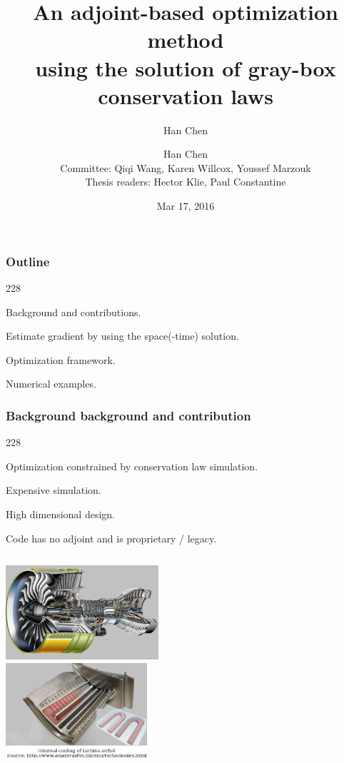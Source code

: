 \documentclass{beamer}
\title{An adjoint-based optimization method\\ using the solution of gray-box conservation laws}
\author{\scriptsize
   Han Chen\\\vspace{0.5cm}}
\author{\scriptsize
   Han Chen\\\vspace{0.5cm} Committee: Qiqi Wang, Karen Willcox, Youssef Marzouk\\
   Thesis readers: Hector Klie, Paul Constantine}
\date{\scriptsize Mar 17, 2016}
\newcommand{\barrow}{\item[\color{darkred}\ding{228}]}
\begin{document}
\begin{frame}
    \titlepage
\end{frame}

\setcounter{framenumber}{0}
\begin{frame}
    \frametitle{Outline}\small
    \begin{dinglist}{228}
        \barrow Background and contributions.
        \barrow Estimate gradient by using the space(-time) solution.
        \barrow Optimization framework.
        \barrow Numerical examples.
    \end{dinglist}
\end{frame}


\begin{frame}
    \frametitle{Background \hfill \scriptsize{background and contribution}}\small
    \begin{dinglist}{228}
        \barrow Optimization constrained by conservation law simulation.
        \barrow Expensive simulation.
        \barrow High dimensional design.
        \barrow Code has no adjoint and is proprietary / legacy.
    \end{dinglist}
    \begin{columns}
        \centering
            \includegraphics[height=3.5cm]{turbine_1.png}\\
        \centering
            \includegraphics[height=3.5cm]{turbine_2.png}
    \end{columns}
\end{frame}
\end{document}
